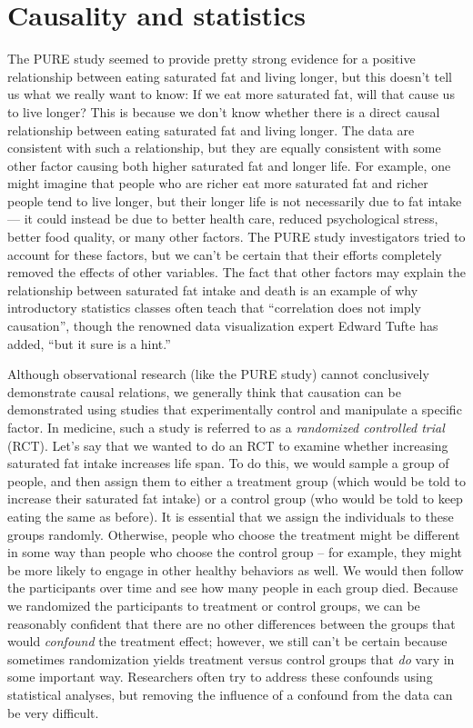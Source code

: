 \documentclass[12pt,]{book}
\theoremstyle{definition}
\theoremstyle{definition}
\theoremstyle{definition}
\theoremstyle{remark}
\begin{document}
\hypertarget{causality-and-statistics}{%
\section{Causality and statistics}\label{causality-and-statistics}}

The PURE study seemed to provide pretty strong evidence for a positive relationship between eating saturated fat and living longer, but this doesn't tell us what we really want to know: If we eat more saturated fat, will that cause us to live longer? This is because we don't know whether there is a direct causal relationship between eating saturated fat and living longer. The data are consistent with such a relationship, but they are equally consistent with some other factor causing both higher saturated fat and longer life. For example, one might imagine that people who are richer eat more saturated fat and richer people tend to live longer, but their longer life is not necessarily due to fat intake --- it could instead be due to better health care, reduced psychological stress, better food quality, or many other factors. The PURE study investigators tried to account for these factors, but we can't be certain that their efforts completely removed the effects of other variables. The fact that other factors may explain the relationship between saturated fat intake and death is an example of why introductory statistics classes often teach that ``correlation does not imply causation'', though the renowned data visualization expert Edward Tufte has added, ``but it sure is a hint.''

Although observational research (like the PURE study) cannot conclusively demonstrate causal relations, we generally think that causation can be demonstrated using studies that experimentally control and manipulate a specific factor. In medicine, such a study is referred to as a \emph{randomized controlled trial} (RCT). Let's say that we wanted to do an RCT to examine whether increasing saturated fat intake increases life span. To do this, we would sample a group of people, and then assign them to either a treatment group (which would be told to increase their saturated fat intake) or a control group (who would be told to keep eating the same as before). It is essential that we assign the individuals to these groups randomly. Otherwise, people who choose the treatment might be different in some way than people who choose the control group -- for example, they might be more likely to engage in other healthy behaviors as well. We would then follow the participants over time and see how many people in each group died. Because we randomized the participants to treatment or control groups, we can be reasonably confident that there are no other differences between the groups that would \emph{confound} the treatment effect; however, we still can't be certain because sometimes randomization yields treatment versus control groups that \emph{do} vary in some important way. Researchers often try to address these confounds using statistical analyses, but removing the influence of a confound from the data can be very difficult.
\end{document}

